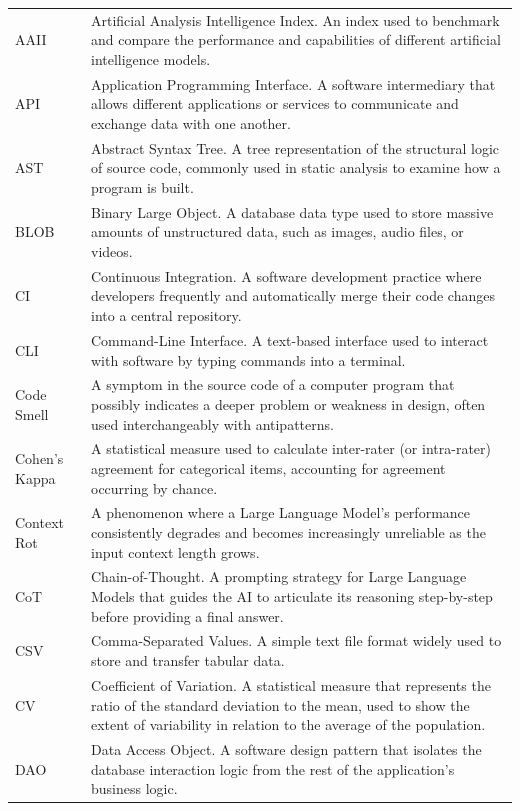 \begin{longtable}{p{3cm}p{10cm}}  %
AAII & Artificial Analysis Intelligence Index. An index used to benchmark and compare the performance and capabilities of different artificial intelligence models.\\
API & Application Programming Interface. A software intermediary that allows different applications or services to communicate and exchange data with one another.\\
AST & Abstract Syntax Tree. A tree representation of the structural logic of source code, commonly used in static analysis to examine how a program is built.\\
BLOB & Binary Large Object. A database data type used to store massive amounts of unstructured data, such as images, audio files, or videos.\\
CI & Continuous Integration. A software development practice where developers frequently and automatically merge their code changes into a central repository.\\
CLI & Command-Line Interface. A text-based interface used to interact with software by typing commands into a terminal.\\
Code Smell & A symptom in the source code of a computer program that possibly indicates a deeper problem or weakness in design, often used interchangeably with antipatterns.\\
Cohen’s Kappa & A statistical measure used to calculate inter-rater (or intra-rater) agreement for categorical items, accounting for agreement occurring by chance.\\
Context Rot & A phenomenon where a Large Language Model's performance consistently degrades and becomes increasingly unreliable as the input context length grows.\\
CoT & Chain-of-Thought. A prompting strategy for Large Language Models that guides the AI to articulate its reasoning step-by-step before providing a final answer.\\
CSV & Comma-Separated Values. A simple text file format widely used to store and transfer tabular data.\\
CV & Coefficient of Variation. A statistical measure that represents the ratio of the standard deviation to the mean, used to show the extent of variability in relation to the average of the population.\\
DAO & Data Access Object. A software design pattern that isolates the database interaction logic from the rest of the application's business logic.\\

\end{longtable}
